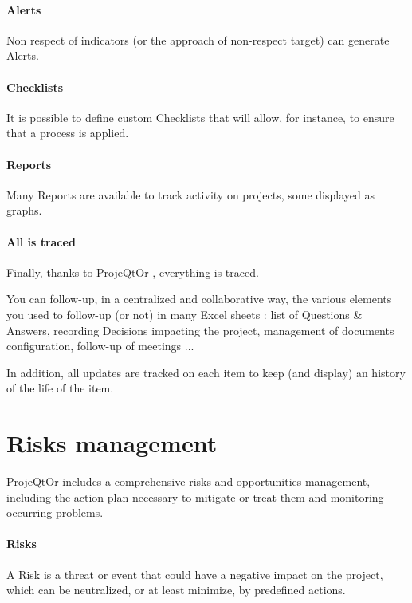 \documentclass[letterpaper,10pt,english]{sphinxmanual}
\begin{document}
\paragraph{Alerts}

Non respect of indicators (or the approach of non-respect target) can generate Alerts.

\paragraph{Checklists}

It is possible to define custom Checklists that will allow, for instance, to ensure that a process is applied.

\paragraph{Reports}

Many Reports are available to track activity on projects, some displayed as graphs.
\paragraph{All is traced}

Finally, thanks to ProjeQtOr , everything is traced.

You can follow-up, in a centralized and collaborative way, the various elements you used to follow-up (or not) in many Excel sheets : list of Questions \& Answers, recording Decisions impacting the project, management of documents configuration, follow-up of meetings ...

In addition, all updates are tracked on each item to keep (and display) an history of the life of the item.
\newpage
{}

\section{Risks management}
\label{Features:index-31}\label{Features:risks-management}
ProjeQtOr  includes a comprehensive risks and opportunities management, including the action plan necessary to mitigate or treat them and monitoring occurring problems.

\paragraph{Risks}

A Risk is a threat or event that could have a negative impact on the project, which can be neutralized, or at least minimize, by predefined actions.
\end{document}
